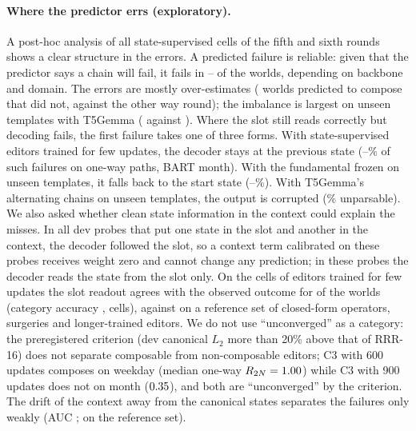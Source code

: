 \paragraph{Where the predictor errs (exploratory).}
A post-hoc analysis of all state-supervised cells of the fifth and sixth rounds shows a clear structure in the errors. A predicted failure
is reliable: given that the predictor says a chain will fail, it fails in \CLfifteenPrecFailMin{}--\CLfifteenPrecFailMax{} of the worlds,
depending on backbone and domain. The errors are mostly over-estimates (\CLfifteenOver{} worlds predicted to compose that did not,
against \CLfifteenUnder{} the other way round); the imbalance is largest on unseen templates with T5Gemma (\CLfifteenTfiveOver{} against
\CLfifteenTfiveUnder{}). Where the slot still reads correctly but decoding fails, the first failure takes one of three forms. With
state-supervised editors trained for few updates, the decoder stays at the previous state (\CLfifteenPrevMin{}--\CLfifteenPrevMax{}\%
of such failures on one-way paths, BART month). With the fundamental frozen on unseen templates, it falls back to the start state
(\CLfifteenStartMin{}--\CLfifteenStartMax{}\%). With T5Gemma's alternating chains on unseen templates, the output is corrupted
(\CLfifteenUnparsable{}\% unparsable). We also asked whether clean state information in the context could explain the misses. In all
\CLfifteenProbes{} dev probes that put one state in the slot and another in the context, the decoder followed the slot, so a context
term calibrated on these probes receives weight zero and cannot change any prediction; in these probes the decoder reads the state
from the slot only. On the cells of editors trained for few updates the slot readout agrees with the observed outcome for
\CLfifteenCtOneAgree{} of the worlds (category accuracy \CLfifteenCtOneCat{}, \CLfifteenCtOneCells{} cells), against
\CLfifteenCtTwoAgree{} on a reference set of closed-form operators, surgeries and longer-trained editors. We do not use ``unconverged''
as a category: the preregistered criterion (dev canonical $L_2$ more than 20\% above that of RRR-16) does not separate composable from
non-composable editors; C3 with 600 updates composes on weekday (median one-way $R_{2N} = 1.00{}$) while C3 with
900 updates does not on month ($0.35{}$), and both are ``unconverged'' by the criterion. The drift of the context
away from the canonical states separates the failures only weakly (AUC \CLfifteenDriftAucCtOne{}; \CLfifteenDriftAucCtTwo{} on the
reference set).


